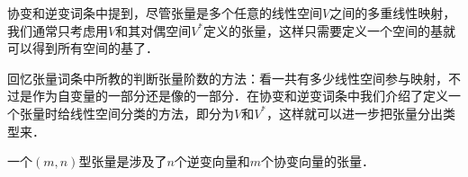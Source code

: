


协变和逆变词条中提到，尽管张量是多个任意的线性空间$V$之间的多重线性映射，我们通常只考虑用$V$和其对偶空间$V^*$定义的张量，这样只需要定义一个空间的基就可以得到所有空间的基了．

回忆张量词条中所教的判断张量阶数的方法：看一共有多少线性空间参与映射，不过是作为自变量的一部分还是像的一部分．在协变和逆变词条中我们介绍了定义一个张量时给线性空间分类的方法，即分为$V$和$V^*$，这样就可以进一步把张量分出类型来．

\begin{definition}{}
一个$(m, n)$型张量是涉及了$n$个逆变向量和$m$个协变向量的张量．
\end{definition}





